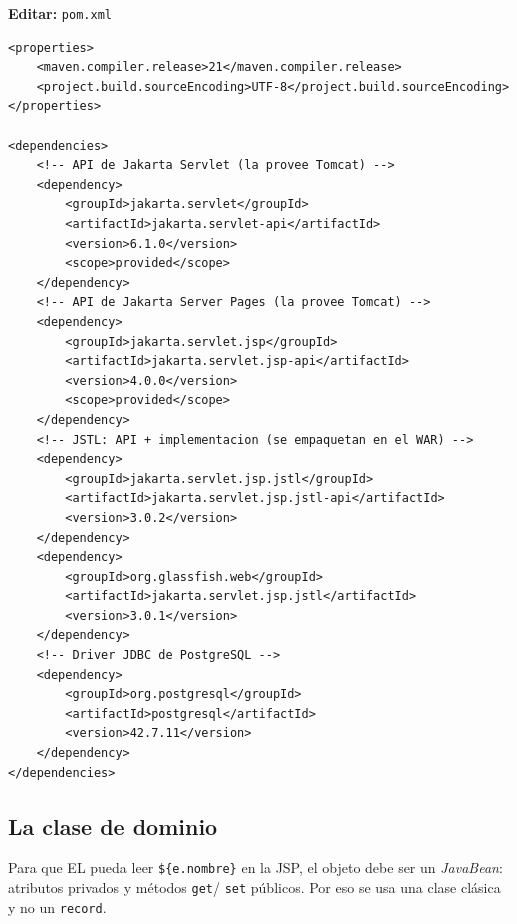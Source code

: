 \documentclass[11pt,a4paper,openany]{book}
\begin{document}
{\small\textbf{Editar:} \texttt{pom.xml}}
\begin{lstlisting}[style=xml,caption={Dependencias del proyecto JSP},label={lst:jsp-pom}]
<properties>
    <maven.compiler.release>21</maven.compiler.release>
    <project.build.sourceEncoding>UTF-8</project.build.sourceEncoding>
</properties>

<dependencies>
    <!-- API de Jakarta Servlet (la provee Tomcat) -->
    <dependency>
        <groupId>jakarta.servlet</groupId>
        <artifactId>jakarta.servlet-api</artifactId>
        <version>6.1.0</version>
        <scope>provided</scope>
    </dependency>
    <!-- API de Jakarta Server Pages (la provee Tomcat) -->
    <dependency>
        <groupId>jakarta.servlet.jsp</groupId>
        <artifactId>jakarta.servlet.jsp-api</artifactId>
        <version>4.0.0</version>
        <scope>provided</scope>
    </dependency>
    <!-- JSTL: API + implementacion (se empaquetan en el WAR) -->
    <dependency>
        <groupId>jakarta.servlet.jsp.jstl</groupId>
        <artifactId>jakarta.servlet.jsp.jstl-api</artifactId>
        <version>3.0.2</version>
    </dependency>
    <dependency>
        <groupId>org.glassfish.web</groupId>
        <artifactId>jakarta.servlet.jsp.jstl</artifactId>
        <version>3.0.1</version>
    </dependency>
    <!-- Driver JDBC de PostgreSQL -->
    <dependency>
        <groupId>org.postgresql</groupId>
        <artifactId>postgresql</artifactId>
        <version>42.7.11</version>
    </dependency>
</dependencies>
\end{lstlisting}

\subsection{La clase de dominio}
\label{ap:crud:jsp:dominio}

Para que EL pueda leer \texttt{\$\{e.nombre\}} en la JSP, el objeto debe
ser un \emph{JavaBean}: atributos privados y métodos \texttt{get}/%
\texttt{set} públicos. Por eso se usa una clase clásica y no un
\texttt{record}.
\end{document}
